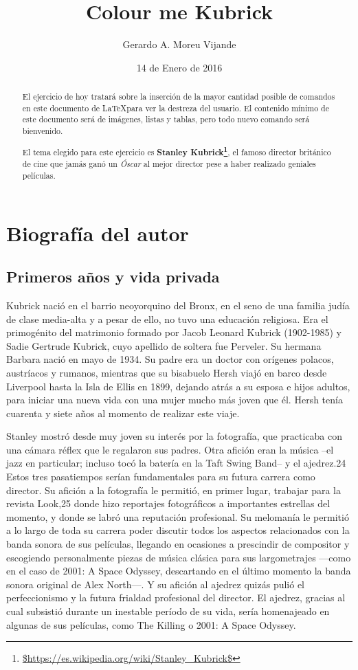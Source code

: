 \documentclass[12pt,a4paper]{article}
\begin{document}
\author{Gerardo A. Moreu Vijande}
\title{Colour me Kubrick}
\date{14 de Enero de 2016}
\maketitle

\begin{abstract}
El ejercicio de hoy tratará sobre la inserción de la mayor cantidad posible de comandos en este documento de \LaTeX para ver la destreza del usuario. El contenido mínimo de este documento será de imágenes, listas y tablas, pero todo nuevo comando será bienvenido.  

El tema elegido para este ejercicio es \textbf{Stanley Kubrick\footnote{\url{$https://es.wikipedia.org/wiki/Stanley_Kubrick$}}}, el famoso director británico de cine que jamás ganó un \textit{Óscar} al mejor director pese a haber realizado geniales películas.
\end{abstract}
\tableofcontents
\section{Biografía del autor}
\subsection{Primeros años y vida privada}
Kubrick nació en el barrio neoyorquino del Bronx, en el seno de una familia judía de clase media-alta y a pesar de ello, no tuvo una educación religiosa. Era el primogénito del matrimonio formado por Jacob Leonard Kubrick (1902-1985) y Sadie Gertrude Kubrick, cuyo apellido de soltera fue Perveler. Su hermana Barbara nació en mayo de 1934. Su padre era un doctor con orígenes polacos, austríacos y rumanos, mientras que su bisabuelo Hersh viajó en barco desde Liverpool hasta la Isla de Ellis en 1899, dejando atrás a su esposa e hijos adultos, para iniciar una nueva vida con una mujer mucho más joven que él. Hersh tenía cuarenta y siete años al momento de realizar este viaje.

Stanley mostró desde muy joven su interés por la fotografía, que practicaba con una cámara réflex que le regalaron sus padres. Otra afición eran la música –el jazz en particular; incluso tocó la batería en la Taft Swing Band– y el ajedrez.24 Estos tres pasatiempos serían fundamentales para su futura carrera como director. Su afición a la fotografía le permitió, en primer lugar, trabajar para la revista Look,25 donde hizo reportajes fotográficos a importantes estrellas del momento, y donde se labró una reputación profesional. Su melomanía le permitió a lo largo de toda su carrera poder discutir todos los aspectos relacionados con la banda sonora de sus películas, llegando en ocasiones a prescindir de compositor y escogiendo personalmente piezas de música clásica para sus largometrajes —como en el caso de 2001: A Space Odyssey, descartando en el último momento la banda sonora original de Alex North—. Y su afición al ajedrez quizás pulió el perfeccionismo y la futura frialdad profesional del director. El ajedrez, gracias al cual subsistió durante un inestable período de su vida, sería homenajeado en algunas de sus películas, como The Killing o 2001: A Space Odyssey.
\end{document}
